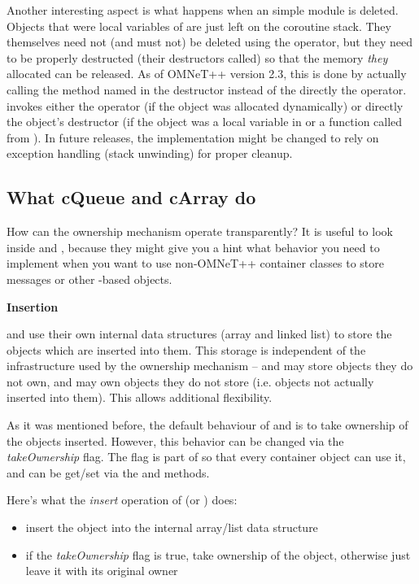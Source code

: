 Another interesting aspect is what happens when an 
simple module is deleted. Objects that were local variables
of  are just left on the coroutine stack.
They themselves need not (and must not) be deleted using the
 operator, but they need to be properly destructed
(their destructors called) so that the memory \textit{they} allocated
can be released. As of OMNeT++ version 2.3, this is done by actually
calling the method named  in the  destructor
instead of the directly the  operator. 
invokes either the  operator (if the object was allocated
dynamically) or directly the object's destructor (if the object was
a local variable in  or a function called from
). In future releases, the implementation might
be changed to rely on exception handling (stack unwinding) for proper
cleanup.


\subsection{What cQueue and cArray do}

How can the ownership mechanism operate transparently?
It is useful to look inside  and ,
because they might give you a hint what behavior you need
to implement when you want to use non-OMNeT++ container classes
to store messages or other -based objects.

\textbf{Insertion}

 and  use their own internal data structures
(array and linked list) to store the objects which are inserted
into them. This storage is independent of the infrastructure used
by the ownership mechanism --  and 
may store objects they do not own, and may own objects
they do not store (i.e. objects not actually inserted into them).
This allows additional flexibility.

As it was mentioned before, the default behaviour of  and
 is to take ownership of the objects inserted.
However, this behavior can be changed via the \textit{takeOwnership} flag.
The flag is part of  so that every container object
can use it, and can be get/set via the
 and  methods.

Here's what the \textit{insert} operation of  (or ) does:
\begin{itemize}
    \item{insert the object into the internal array/list data structure}

    \item{if the \textit{takeOwnership} flag is true, take ownership
    of the object, otherwise just leave it with its original owner}
\end{itemize}

